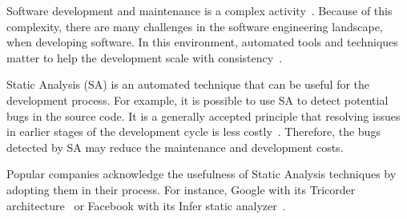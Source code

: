 %

Software development and maintenance is a complex activity~\cite{clarke2016}. Because of this complexity, there are many challenges in the software engineering landscape, when developing software. In this environment, automated tools and techniques matter to help the development scale with consistency~\cite{winters2020}. 

Static Analysis (SA) is an automated technique that can be useful for the development process. For example, it is possible to use SA to detect potential bugs in the source code. It is a generally accepted principle that resolving issues in earlier stages of the development cycle is less costly~\cite{dawson2010}. Therefore, the bugs detected by SA may reduce the maintenance and development costs.

Popular companies acknowledge the usefulness of Static Analysis techniques by adopting them in their process. For instance, Google with its Tricorder architecture~\cite{sa_google} or Facebook with its Infer static analyzer~\cite{infer}.

